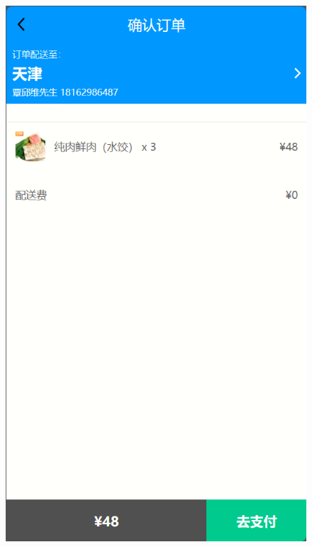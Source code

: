 \begin{figure}[h]
\begin{minipage}[b]{0.3\linewidth}
        \includegraphics[width=\linewidth]{uiFigs/订单确认.png}
     \end{minipage}
    \begin{minipage}[b]{0.3\linewidth}

\end{minipage}
\end{figure}
